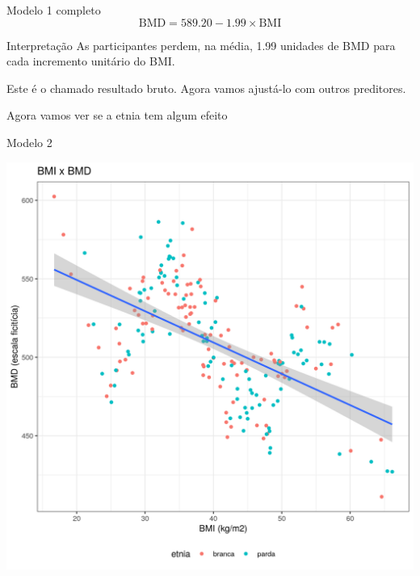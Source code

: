 \documentclass{beamer}
\begin{document}
\begin{frame}{\scriptsize }
  \begin{exampleblock}{Modelo 1 completo}
    \footnotesize
    \begin{displaymath}
      \text{BMD} =589.20 -1.99 \times\text{BMI}
    \end{displaymath}
  \end{exampleblock}

  \bigskip
  \begin{exampleblock}{Interpretação}
    \footnotesize
    As participantes perdem, na média, 1.99 unidades de BMD para cada incremento unitário do BMI.

    \bigskip
    Este é o chamado resultado bruto. Agora vamos ajustá-lo com outros preditores.
  \end{exampleblock}
\end{frame}

\begin{frame}{\scriptsize }
  \begin{center}
    Agora vamos ver se a etnia tem algum efeito
  \end{center}
\end{frame}

\begin{frame}{\scriptsize Modelo 2}
  \begin{center}
    \includegraphics[height=.9\textheight]{Cap31-32/pratica-rlm2_0}
  \end{center}
\end{frame}
\end{document}

